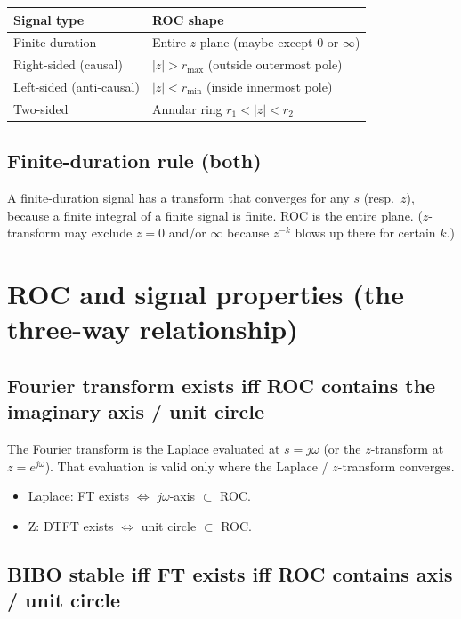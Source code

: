 \documentclass[11pt]{article}
\begin{document}
\begin{center}
\begin{tabular}{@{}l l@{}}
\toprule
Signal type & ROC shape \\
\midrule
Finite duration & Entire $z$-plane (maybe except $0$ or $\infty$) \\
Right-sided (causal) & $|z| > r_{\max}$ (outside outermost pole) \\
Left-sided (anti-causal) & $|z| < r_{\min}$ (inside innermost pole) \\
Two-sided & Annular ring $r_1 < |z| < r_2$ \\
\bottomrule
\end{tabular}
\end{center}

\subsection{Finite-duration rule (both)}

A finite-duration signal has a transform that converges for any $s$ (resp.\ $z$), because a finite integral of a finite signal is finite. ROC is the entire plane. ($z$-transform may exclude $z=0$ and/or $\infty$ because $z^{-k}$ blows up there for certain $k$.)

\section{ROC and signal properties (the three-way relationship)}

\subsection{Fourier transform exists iff ROC contains the imaginary axis / unit circle}

The Fourier transform is the Laplace evaluated at $s = j\omega$ (or the $z$-transform at $z = e^{j\omega}$). That evaluation is valid only where the Laplace / $z$-transform converges.
\begin{itemize}
  \item Laplace: FT exists $\iff$ $j\omega$-axis $\subset$ ROC.
  \item Z: DTFT exists $\iff$ unit circle $\subset$ ROC.
\end{itemize}

\subsection{BIBO stable iff FT exists iff ROC contains axis / unit circle}
\end{document}
